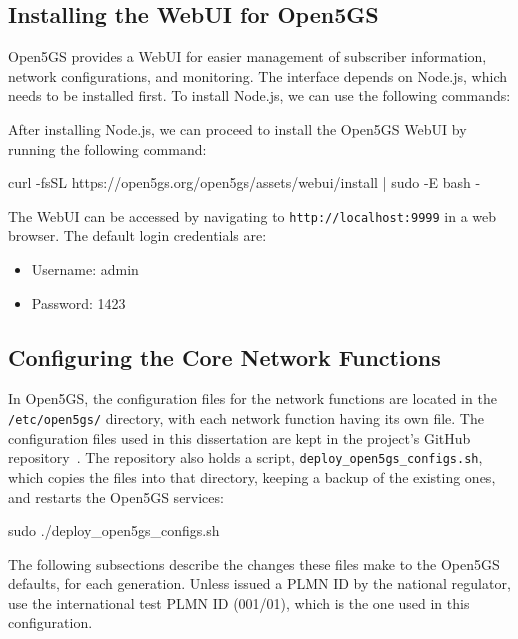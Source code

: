 \subsection{Installing the WebUI for Open5GS}
\label{sec:Installing_WebUI_for_Open5GS}
Open5GS provides a WebUI for easier management of subscriber information, network configurations, and monitoring. The interface depends on Node.js, which needs to be installed first.
To install Node.js, we can use the following commands:
After installing Node.js, we can proceed to install the Open5GS WebUI by running the following command:
\begin{code}
curl -fsSL https://open5gs.org/open5gs/assets/webui/install |
sudo -E bash -
\end{code}
The WebUI can be accessed by navigating to \texttt{http://localhost:9999} in a web browser. The default login credentials are:
\begin{itemize}
    \item Username: admin
    \item Password: 1423
\end{itemize}

\subsection{Configuring the Core Network Functions}
\label{sec:Configuring_Open5GS_Components}
In Open5GS, the configuration files for the network functions are located in the \texttt{/etc/open5gs/} directory, with each network function having its own file. The configuration files used in this dissertation are kept in the project's GitHub repository~\cite{thesis_repo}. The repository also holds a script, \texttt{deploy\_open5gs\_configs.sh}, which copies the files into that directory, keeping a backup of the existing ones, and restarts the Open5GS services:
\begin{code}
sudo ./deploy_open5gs_configs.sh
\end{code}
The following subsections describe the changes these files make to the Open5GS defaults, for each generation. Unless issued a \gls{PLMN} ID by the national regulator, use the international test \gls{PLMN} ID (001/01), which is the one used in this configuration.

